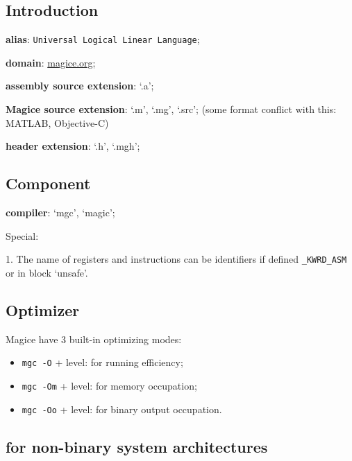 
\subsection{Introduction}

\textbf{alias}: \texttt{Universal Logical Linear Language};

\textbf{domain}: \href{http://magice.org}{magice.org};

\textbf{assembly source extension}: `.a';

\textbf{Magice source extension}: `.m', `.mg', `.src'; (some format conflict with this: MATLAB, Objective-C)

\textbf{header extension}: `.h', `.mgh';

\subsection{Component}

\textbf{compiler}: `mgc', `magic';

Special:

1. The name of registers and instructions can be identifiers if defined \verb|_KWRD_ASM| or in block `unsafe'.

\subsection{Optimizer}

Magice have 3 built-in optimizing modes:

\begin{itemize}
\item \verb|mgc -O| + level: for running efficiency;
\item \verb|mgc -Om| + level: for memory occupation;
\item \verb|mgc -Oo| + level: for binary output occupation.
\end{itemize}

\subsection{for non-binary system architectures}
